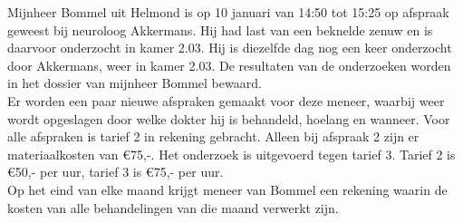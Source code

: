 

Mijnheer Bommel uit Helmond is op 10 januari van 14:50 tot 15:25 op
afspraak geweest bij neuroloog Akkermans. Hij had last van een
beknelde zenuw en is daarvoor onderzocht in kamer 2.03. Hij is
diezelfde dag nog een keer onderzocht door Akkermans, weer in kamer
2.03. De resultaten van de
onderzoeken worden in het dossier van mijnheer Bommel bewaard.\\
Er worden een paar nieuwe afspraken gemaakt voor deze meneer, waarbij weer wordt
opgeslagen door welke dokter hij is behandeld, hoelang en wanneer. Voor alle
afspraken is tarief 2 in rekening gebracht. Alleen bij afspraak 2 zijn er
materiaalkosten van \euro 75,-. Het onderzoek is uitgevoerd tegen tarief 3.
Tarief 2 is \euro 50,- per uur, tarief 3 is \euro 75,- per uur.\\
Op het eind van elke maand krijgt meneer van Bommel een rekening waarin de kosten
van alle behandelingen van die maand verwerkt zijn.


%
%

